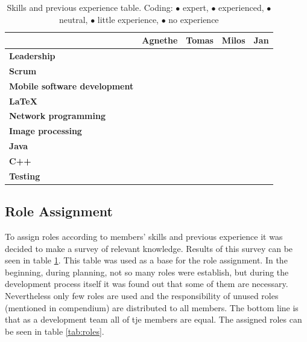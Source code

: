 \begin{table}\centering {}
    \caption{Skills and previous experience table. Coding:
        \textcolor{green!100}{$\bullet$} expert,
        \textcolor{green!60}{$\bullet$} experienced,
        \textcolor{yellow!75}{$\bullet$} neutral,
        \textcolor{orange!90}{$\bullet$} little experience,
        \textcolor{red!80}{$\bullet$} no experience}
    \label{tab:skills}
    \vspace{2mm}
    \begin{tabular}{lcccc}
    \toprule
                                & Agnethe   & Tomas & Milos & Jan \\
    \midrule
    \textbf{Leadership                 } &  &  &  &  \\ 
    \textbf{Scrum                      } &  &  &  &  \\ 
    \textbf{Mobile software development} &  &  &  &  \\ 
    \textbf{\LaTeX                     } &  &  &  &  \\ 
    \textbf{Network programming        } &  &  &  &  \\ 
    \textbf{Image processing           } &  &  &  &  \\ 
    \textbf{Java                       } &  &  &  &  \\ 
    \textbf{C++                        } &  &  &  &  \\ 
    \textbf{Testing                    } &  &  &  &  \\
    \bottomrule
    \end{tabular}
\end{table}

\subsection{Role Assignment}
To assign roles according to members' skills and previous experience it was decided to make a survey of relevant knowledge. 
Results of this survey can be seen in table \ref{tab:skills}. 
This table was used as a base for the role assignment.
In the beginning, during planning, not so many roles were establish, but during the development process itself it was found out that some of them are necessary. 
Nevertheless only few roles are used and the responsibility of unused roles (mentioned in compendium) are distributed to all members. 
The bottom line is that as a development team all of tje members are equal.
The assigned roles can be seen in table \ref{tab:roles}. 

